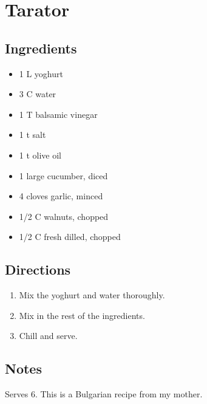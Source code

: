 \documentclass[letterpaper,10pt,english]{sphinxmanual}
\begin{document}
\chapter{Tarator}
\label{tarator:tarator}\label{tarator::doc}

\section{Ingredients}
\label{tarator:ingredients}\begin{itemize}
\item {} 
1   L       yoghurt

\item {} 
3   C       water

\item {} 
1       T       balsamic vinegar

\item {} 
1       t       salt

\item {} 
1       t       olive oil

\item {} 
1           large cucumber, diced

\item {} 
4           cloves garlic, minced

\item {} 
1/2     C       walnuts, chopped

\item {} 
1/2     C       fresh dilled, chopped

\end{itemize}


\section{Directions}
\label{tarator:directions}\begin{enumerate}
\item {} 
Mix the yoghurt and water thoroughly.

\item {} 
Mix in the rest of the ingredients.

\item {} 
Chill and serve.

\end{enumerate}


\section{Notes}
\label{tarator:notes}
Serves 6. This is a Bulgarian recipe from my mother.
\end{document}
